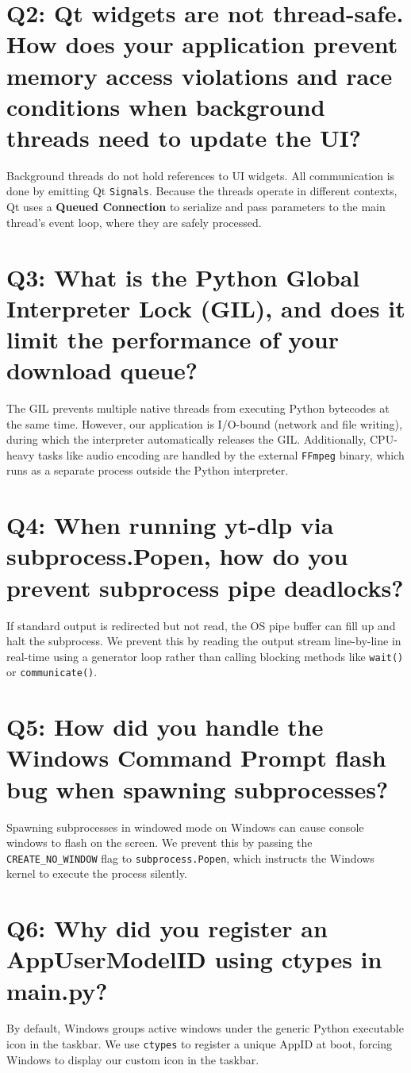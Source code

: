 \documentclass[12pt]{report}
\begin{document}
\section[Question 2]{Q2: Qt widgets are not thread-safe. How does your application prevent memory access violations and race conditions when background threads need to update the UI?}
Background threads do not hold references to UI widgets. All communication is done by emitting Qt \texttt{Signals}. Because the threads operate in different contexts, Qt uses a \textbf{Queued Connection} to serialize and pass parameters to the main thread's event loop, where they are safely processed.

\section[Question 3]{Q3: What is the Python Global Interpreter Lock (GIL), and does it limit the performance of your download queue?}
The GIL prevents multiple native threads from executing Python bytecodes at the same time. However, our application is I/O-bound (network and file writing), during which the interpreter automatically releases the GIL. Additionally, CPU-heavy tasks like audio encoding are handled by the external \texttt{FFmpeg} binary, which runs as a separate process outside the Python interpreter.

\section[Question 4]{Q4: When running yt-dlp via subprocess.Popen, how do you prevent subprocess pipe deadlocks?}
If standard output is redirected but not read, the OS pipe buffer can fill up and halt the subprocess. We prevent this by reading the output stream line-by-line in real-time using a generator loop rather than calling blocking methods like \texttt{wait()} or \texttt{communicate()}.

\section[Question 5]{Q5: How did you handle the Windows Command Prompt flash bug when spawning subprocesses?}
Spawning subprocesses in windowed mode on Windows can cause console windows to flash on the screen. We prevent this by passing the \texttt{CREATE\_NO\_WINDOW} flag to \texttt{subprocess.Popen}, which instructs the Windows kernel to execute the process silently.

\section[Question 6]{Q6: Why did you register an AppUserModelID using ctypes in main.py?}
By default, Windows groups active windows under the generic Python executable icon in the taskbar. We use \texttt{ctypes} to register a unique AppID at boot, forcing Windows to display our custom icon in the taskbar.
\end{document}
